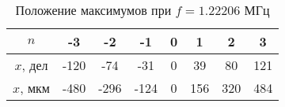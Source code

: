 \begin{table}[h!]
    \centering
    \begin{tabular}{|c|c|c|c|c|c|c|c|}
    \hline
    $n$      & -3   & -2   & -1   & 0 & 1   & 2   & 3   \\ \hline
    $x$, дел & -120 & -74  & -31  & 0 & 39  & 80  & 121 \\ \hline
    $x$, мкм & -480 & -296 & -124 & 0 & 156 & 320 & 484 \\ \hline
    \end{tabular}
    \caption{Положение максимумов при $f = 1.22206$ МГц}
    \label{tab:frequency4}
\end{table}